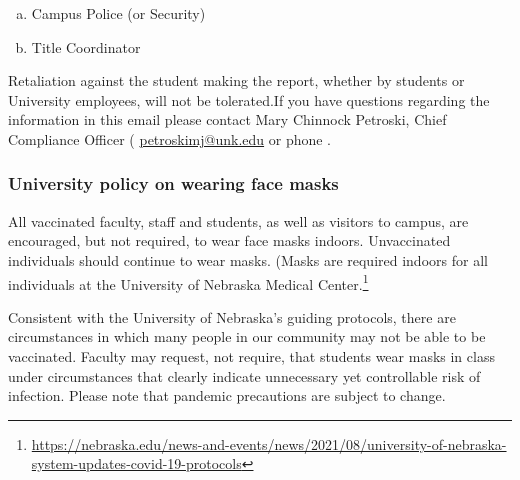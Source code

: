 \documentclass[12pt]{article}
\newenvironment{alphalist}{
  \begin{enumerate}[(a)]
    \addtolength{\itemsep}{-0.5\itemsep}}
  {\end{enumerate}}
\newcommand{\RomanNumeralCaps}[1]
      {\MakeUppercase{\romannumeral #1}}
\begin{document}
\begin{enumerate}
\begin{alphalist}
\item Campus Police (or Security) 

\item Title \RomanNumeralCaps{9} Coordinator 

\end{alphalist}
Retaliation against the student making the report, whether by students or University employees, will not be tolerated.If you have questions regarding the information in this email please 
contact Mary Chinnock Petroski, Chief Compliance Officer (
   \href{mailto:petroskimj@unk.edu}{petroskimj@unk.edu} 
    or phone .

\subsubsection*{University policy on wearing face masks}    
    All vaccinated faculty, staff and students, as well 
    as visitors to campus, are encouraged, but not required, 
    to wear face masks indoors. Unvaccinated individuals 
    should continue to wear masks. (Masks are required indoors for all 
    individuals at the University of Nebraska Medical Center.\footnote{\small
    \url{https://nebraska.edu/news-and-events/news/2021/08/university-of-nebraska-system-updates-covid-19-protocols}}

 

    Consistent with the University of Nebraska’s guiding protocols, there 
    are circumstances in which many people in our community may not be able to 
    be vaccinated. Faculty may request, not require, that students wear masks in 
    class under circumstances that clearly indicate unnecessary yet controllable 
    risk of infection.  Please note that pandemic precautions are subject to change.




\end{enumerate}
\end{document}
